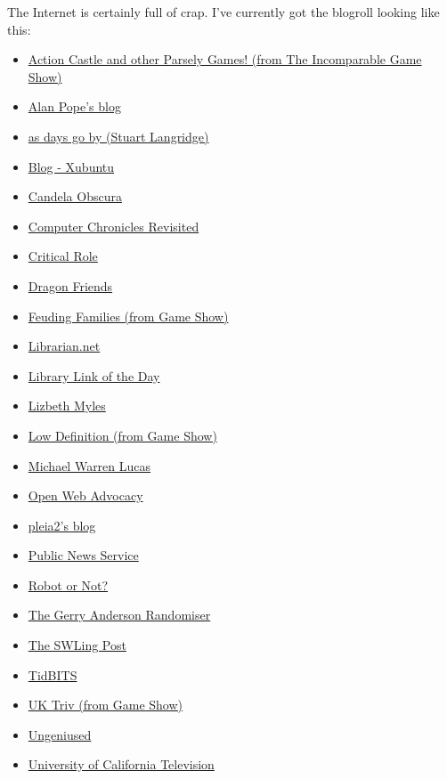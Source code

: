 The Internet is certainly full of crap. I've currently got the blogroll
looking like this:

\begin{itemize}
\tightlist
\item
  \href{https://www.theincomparable.com/gameshow/actioncastle/}{Action
  Castle and other Parsely Games! (from The Incomparable Game Show)}
\item
  \href{https://popey.com/blog/}{Alan Pope's blog}
\item
  \href{https://www.kryogenix.org/days/}{as days go by (Stuart
  Langridge)}
\item
  \href{https://xubuntu.org/}{Blog - Xubuntu}
\item
  \href{https://critrole.com/shows/candela-obscura/}{Candela Obscura}\\
\item
  \href{https://smoliva.blog/}{Computer Chronicles Revisited}
\item
  \href{https://critrole.com/}{Critical Role}\\
\item
  \href{https://thedragonfriends.com/}{Dragon Friends}
\item
  \href{https://www.theincomparable.com/gameshow/feud/}{Feuding Families
  (from Game Show)}
\item
  \href{https://www.librarian.net/}{Librarian.net}
\item
  \href{https://www.tk421.net/librarylink/}{Library Link of the Day}
\item
  \href{https://lmmyles.com/}{Lizbeth Myles}
\item
  \href{https://www.theincomparable.com/gameshow/lowdef/}{Low Definition
  (from Game Show)}
\item
  \href{https://mwl.io/}{Michael Warren Lucas}
\item
  \href{https://open-web-advocacy.org/}{Open Web Advocacy}
\item
  \href{https://princessleia.com/journal}{pleia2's blog}
\item
  \href{https://www.publicnewsservice.org/}{Public News Service}
\item
  \href{https://www.theincomparable.com/robot/}{Robot or Not?}
\item
  \href{https://gerry-anderson-randomiser.captivate.fm}{The Gerry
  Anderson Randomiser}
\item
  \href{https://swling.com/blog}{The SWLing Post}
\item
  \href{https://tidbits.com/}{TidBITS}
\item
  \href{https://www.theincomparable.com/gameshow/uktriv/}{UK Triv (from
  Game Show)}
\item
  \href{https://www.relay.fm/ungeniused}{Ungeniused}\\
\item
  \href{http://www.uctv.tv}{University of California Television}
\end{itemize}

